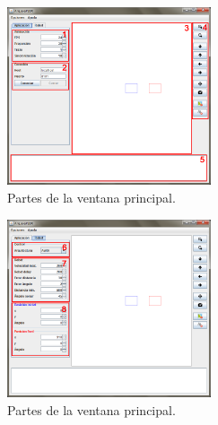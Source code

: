 \documentclass[11pt,twoside,A5]{article}
\begin{document}
\begin{figure}[H]
\begin{center}
\includegraphics[width=6cm]{ventana-principal-partes.png} 
\caption{Partes de la ventana principal.}
\label{fig:ventana-principal-partes}
\end{center}
\end{figure}

\begin{figure}[H]
\begin{center}
\includegraphics[width=6cm]{ventana-principal2-partes.png} 
\caption{Partes de la ventana principal.}
\label{fig:ventana-principal2}
\end{center}
\end{figure} 
\end{document}
